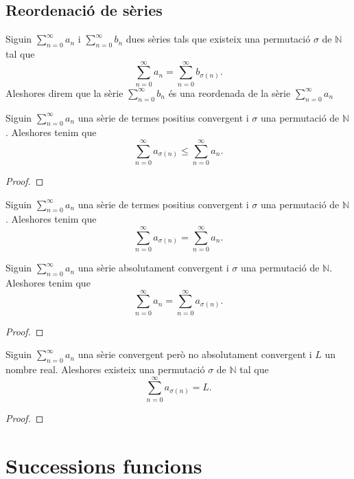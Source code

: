 \documentclass[../Apunts.tex]{subfiles}
\begin{document}
	\subsection{Reordenació de sèries}
	\begin{definition}
		\label{def:reordenada d'una sèrie}
		Siguin \(\sum_{n=0}^{\infty}a_{n}\) i \(\sum_{n=0}^{\infty}b_{n}\) dues sèries tals que existeix una permutació \(\sigma\) de \(\mathbb{N}\) tal que
		\[\sum_{n=0}^{\infty}a_{n}=\sum_{n=0}^{\infty}b_{\sigma(n)}.\]
		Aleshores direm que la sèrie \(\sum_{n=0}^{\infty}b_{n}\) és una reordenada de la sèrie \(\sum_{n=0}^{\infty}a_{n}\)
	\end{definition}
	\begin{lemma}
		Siguin \(\sum_{n=0}^{\infty}a_{n}\) una sèrie de termes positius convergent i \(\sigma\) una permutació de \(\mathbb{N}\). Aleshores tenim que
		\[\sum_{n=0}^{\infty}a_{\sigma(n)}\leq\sum_{n=0}^{\infty}a_{n}.\]
		\begin{proof}
		\end{proof}
	\end{lemma}
	\begin{corollary}
		Siguin \(\sum_{n=0}^{\infty}a_{n}\) una sèrie de termes positius convergent i \(\sigma\) una permutació de \(\mathbb{N}\). Aleshores tenim que
		\[\sum_{n=0}^{\infty}a_{\sigma(n)}=\sum_{n=0}^{\infty}a_{n}.\]
	\end{corollary}
	\begin{lemma}
		Siguin \(\sum_{n=0}^{\infty}a_{n}\) una sèrie absolutament convergent i \(\sigma\) una permutació de \(\mathbb{N}\). Aleshores tenim que
		\[\sum_{n=0}^{\infty}a_{n}=\sum_{n=0}^{\infty}a_{\sigma(n)}.\]
		\begin{proof}
		\end{proof}
	\end{lemma}
	\begin{theorem}
		\label{thm:Teorema de la reordenació de sèries de Riemann}
		Siguin \(\sum_{n=0}^{\infty}a_{n}\) una sèrie convergent però no absolutament convergent i \(L\) un nombre real. Aleshores existeix una permutació \(\sigma\) de \(\mathbb{N}\) tal que
		\[\sum_{n=0}^{\infty}a_{\sigma(n)}=L.\]
		\begin{proof}
		\end{proof}
	\end{theorem}
	\section{Successions funcions}
\end{document}
